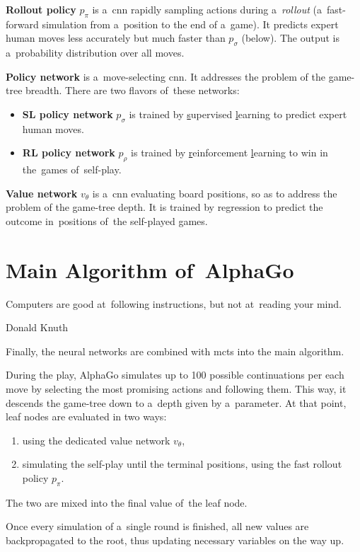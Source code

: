 \textbf{Rollout policy} $p_\pi$ is a~\acrshort{cnn} rapidly sampling actions during a~\emph{rollout} (a~fast-forward simulation from a~position to the end of a~game).
It predicts expert human moves less accurately but much faster than $p_\sigma$ (below).
The output is a~probability distribution over all moves.

\textbf{Policy network} is a~move-selecting \acrshort{cnn}.
It addresses the problem of the game-tree breadth.
There are two flavors of~these networks:
\begin{itemize}
  \item \textbf{SL policy network} $p_\sigma$ is trained by \underline{s}upervised \underline{l}earning to predict expert human moves.
  \item \textbf{RL policy network} $p_\rho$ is trained by \underline{r}einforcement \underline{l}earning to win in the~games of~self-play.
\end{itemize}

\textbf{Value network} $v_\theta$ is a~\acrshort{cnn} evaluating board positions, so as to address the problem of the game-tree depth.
It is trained by regression to predict the outcome in~positions of~the self-played games.

\section{Main Algorithm of~AlphaGo}
\epigraph{
  Computers are good at~following instructions, but not at~reading your mind.
}{Donald Knuth}
Finally, the neural networks are combined with \acrshort{mcts} into the main algorithm.

During the play, AlphaGo simulates up to 100 possible continuations per each move by selecting the most promising actions and following them.
This way, it descends the game-tree down to a~depth given by a~parameter.
At that point, leaf nodes are evaluated in two ways:
\begin{enumerate}[(1)]
  \item using the dedicated value network $v_\theta$,
  \item simulating the self-play until the terminal positions, using the fast rollout policy $p_\pi$.
\end{enumerate}
The two are mixed into the final value of~the leaf node.

Once every simulation of a~single round is finished, all new values are backpropagated to the root, thus updating necessary variables on the way up.

